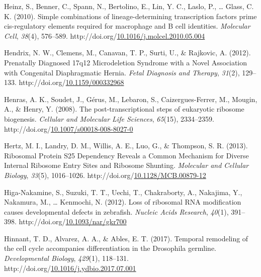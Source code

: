 \documentclass[12pt,oneside]{reedthesis}
\newlength{\cslhangindent}
\newenvironment{CSLReferences}[2] %
 {%
  \setlength{\parindent}{0pt}
  \ifodd #1 \everypar{\setlength{\hangindent}{\cslhangindent}}\ignorespaces\fi
  \ifnum #2 > 0
  \setlength{\parskip}{#2\baselineskip}
  \fi
 }%
 {}
\begin{document}
\begin{CSLReferences}{1}{0}
\leavevmode{}%
Heinz, S., Benner, C., Spann, N., Bertolino, E., Lin, Y. C., Laslo, P., \ldots{} Glass, C. K. (2010). Simple combinations of lineage-determining transcription factors prime cis-regulatory elements required for macrophage and {B} cell identities. \emph{Molecular Cell}, \emph{38}(4), 576--589. http://doi.org/\href{https://doi.org/10.1016/j.molcel.2010.05.004}{10.1016/j.molcel.2010.05.004}

\leavevmode{}%
Hendrix, N. W., Clemens, M., Canavan, T. P., Surti, U., \& Rajkovic, A. (2012). Prenatally {Diagnosed} 17q12 {Microdeletion Syndrome} with a {Novel Association} with {Congenital Diaphragmatic Hernia}. \emph{Fetal Diagnosis and Therapy}, \emph{31}(2), 129--133. http://doi.org/\href{https://doi.org/10.1159/000332968}{10.1159/000332968}

\leavevmode{}%
Henras, A. K., Soudet, J., Gérus, M., Lebaron, S., Caizergues-Ferrer, M., Mougin, A., \& Henry, Y. (2008). The post-transcriptional steps of eukaryotic ribosome biogenesis. \emph{Cellular and Molecular Life Sciences}, \emph{65}(15), 2334--2359. http://doi.org/\href{https://doi.org/10.1007/s00018-008-8027-0}{10.1007/s00018-008-8027-0}

\leavevmode{}%
Hertz, M. I., Landry, D. M., Willis, A. E., Luo, G., \& Thompson, S. R. (2013). Ribosomal {Protein S25 Dependency Reveals} a {Common Mechanism} for {Diverse Internal Ribosome Entry Sites} and {Ribosome Shunting}. \emph{Molecular and Cellular Biology}, \emph{33}(5), 1016--1026. http://doi.org/\href{https://doi.org/10.1128/MCB.00879-12}{10.1128/MCB.00879-12}

\leavevmode{}%
Higa-Nakamine, S., Suzuki, T. T., Uechi, T., Chakraborty, A., Nakajima, Y., Nakamura, M., \ldots{} Kenmochi, N. (2012). Loss of ribosomal {RNA} modification causes developmental defects in zebrafish. \emph{Nucleic Acids Research}, \emph{40}(1), 391--398. http://doi.org/\href{https://doi.org/10.1093/nar/gkr700}{10.1093/nar/gkr700}

\leavevmode{}%
Hinnant, T. D., Alvarez, A. A., \& Ables, E. T. (2017). Temporal remodeling of the cell cycle accompanies differentiation in the {Drosophila} germline. \emph{Developmental Biology}, \emph{429}(1), 118--131. http://doi.org/\href{https://doi.org/10.1016/j.ydbio.2017.07.001}{10.1016/j.ydbio.2017.07.001}


\end{CSLReferences}
\end{document}
